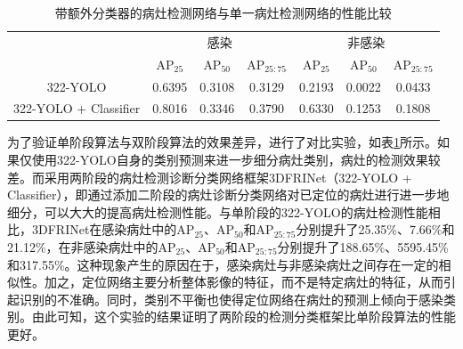 \begin{table}[htbp]
  \centering
  \caption{带额外分类器的病灶检测网络与单一病灶检测网络的性能比较}
  \begin{tabular}{ccccccc}
    \toprule
                          & \multicolumn{3}{c}{感染} & \multicolumn{3}{c}{非感染}                                                               \\
                          & AP\(_{25}\)              & AP\(_{50}\)                & AP\(_{25:75}\) & AP\(_{25}\) & AP\(_{50}\) & AP\(_{25:75}\) \\
    \midrule
    322-YOLO              & 0.6395                   & 0.3108                     & 0.3129         & 0.2193      & 0.0022      & 0.0433         \\
    322-YOLO + Classifier & 0.8016                   & 0.3346                     & 0.3790         & 0.6330      & 0.1253      & 0.1808         \\
    \bottomrule
  \end{tabular}
  \label{tab:chao04_experiment_1vs2}
\end{table}

为了验证单阶段算法与双阶段算法的效果差异，进行了对比实验，如表\ref{tab:chao04_experiment_1vs2}所示。如果仅使用322-YOLO自身的类别预测来进一步细分病灶类别，病灶的检测效果较差。而采用两阶段的病灶检测诊断分类网络框架3DFRINet（322-YOLO + Classifier），即通过添加二阶段的病灶诊断分类网络对已定位的病灶进行进一步地细分，可以大大的提高病灶检测性能。与单阶段的322-YOLO的病灶检测性能相比，3DFRINet在感染病灶中的AP\(_{25}\)、AP\(_{50}\)和AP\(_{25:75}\)分别提升了25.35\%、7.66\%和21.12\%，在非感染病灶中的AP\(_{25}\)、AP\(_{50}\)和AP\(_{25:75}\)分别提升了188.65\%、5595.45\%和317.55\%。这种现象产生的原因在于，感染病灶与非感染病灶之间存在一定的相似性。加之，定位网络主要分析整体影像的特征，而不是特定病灶的特征，从而引起识别的不准确。同时，类别不平衡也使得定位网络在病灶的预测上倾向于感染类别。由此可知，这个实验的结果证明了两阶段的检测分类框架比单阶段算法的性能更好。


